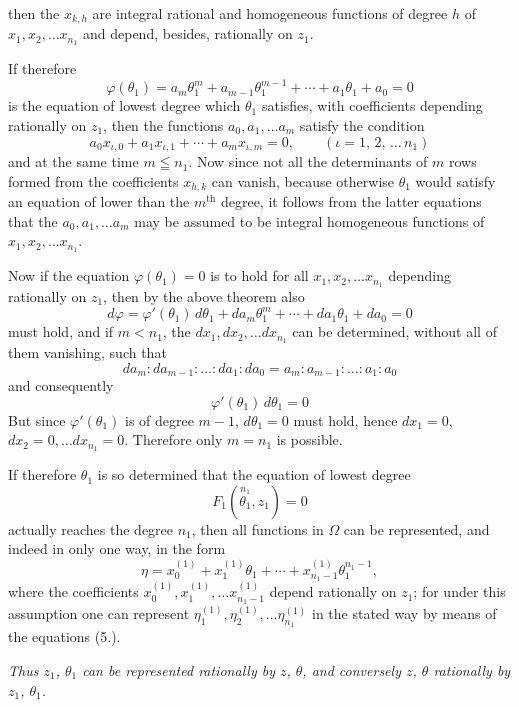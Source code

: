 \documentclass{article}
\begin{document}
then the $x_{k,h}$ are integral rational and homogeneous functions of degree $h$ of $x_{1}, x_{2}, \ldots x_{n_{1}}$ and depend, besides, rationally on $z_{1}$.

If therefore
\[ \varphi(\theta_{1}) = a_{m}\theta_{1}^{m} + a_{m-1}\theta_{1}^{m-1} + \cdots + a_{1}\theta_{1} + a_{0} = 0 \]
is the equation of lowest degree which $\theta_{1}$ satisfies, with coefficients depending rationally on $z_{1}$, then the functions $a_{0}, a_{1}, \ldots a_{m}$ satisfy the condition
\[ a_{0}x_{\iota,0} + a_{1}x_{\iota,1} + \cdots + a_{m}x_{\iota,m} = 0, \qquad {\scriptstyle (\iota = 1,\, 2,\, \ldots\, n_{1})} \]
and at the same time $m \leqq n_{1}$. Now since not all the determinants of $m$ rows formed from the coefficients $x_{h,k}$ can vanish, because otherwise $\theta_{1}$ would satisfy an equation of lower than the $m^{\text{th}}$ degree, it follows from the latter equations that the $a_{0}, a_{1}, \ldots a_{m}$ may be assumed to be integral homogeneous functions of $x_{1}, x_{2}, \ldots x_{n_{1}}$.

Now if the equation $\varphi(\theta_{1}) = 0$ is to hold for all $x_{1}, x_{2}, \ldots x_{n_{1}}$ depending rationally on $z_{1}$, then by the above theorem also
\[ d\varphi = \varphi'(\theta_{1})\,d\theta_{1} + da_{m}\theta_{1}^{m} + \cdots + da_{1}\theta_{1} + da_{0} = 0 \]
must hold, and if $m < n_{1}$, the $dx_{1}, dx_{2}, \ldots dx_{n_{1}}$ can be determined, without all of them vanishing, such that
\[ da_{m} : da_{m-1} : \ldots : da_{1} : da_{0} = a_{m} : a_{m-1} : \ldots : a_{1} : a_{0} \]
and consequently
\[ \varphi'(\theta_{1})\,d\theta_{1} = 0 \]
But since $\varphi'(\theta_{1})$ is of degree $m-1$, $d\theta_{1} = 0$ must hold, hence $dx_{1} = 0$, $dx_{2} = 0, \ldots dx_{n_{1}} = 0$. Therefore only $m = n_{1}$ is possible.

If therefore $\theta_{1}$ is so determined that the equation of lowest degree
\[ F_{1}(\overset{n_{1}}{\theta_{1}}, z_{1}) = 0 \]
actually reaches the degree $n_{1}$, then all functions in $\Omega$ can be represented, and indeed in only one way, in the form
\[ \eta = x_{0}^{(1)} + x_{1}^{(1)}\theta_{1} + \cdots + x_{n_{1}-1}^{(1)}\theta_{1}^{n_{1}-1}, \]
where the coefficients $x_{0}^{(1)}, x_{1}^{(1)}, \ldots x_{n_{1}-1}^{(1)}$ depend rationally on $z_{1}$; for under this assumption one can represent $\eta_{1}^{(1)}, \eta_{2}^{(1)}, \ldots \eta_{n_{1}}^{(1)}$ in the stated way by means of the equations (5.).

\emph{Thus $z_{1}$, $\theta_{1}$ can be represented rationally by $z$, $\theta$, and conversely $z$, $\theta$ rationally by $z_{1}$, $\theta_{1}$.}
\end{document}
